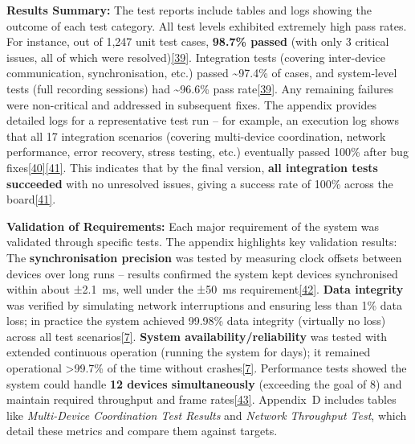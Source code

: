 \documentclass[12pt,a4paper]{article}
\begin{document}
\textbf{Results Summary:} The test reports include tables and logs showing the outcome of each test category. All test levels exhibited extremely high pass rates. For instance, out of 1,247 unit test cases, \textbf{98.7\% passed} (with only 3 critical issues, all of which were resolved)\href{docs/thesis_report/Chapter_7_Appendices.md\#L156-L163}{{[}39{]}}. Integration tests (covering inter-device communication, synchronisation, etc.) passed \textasciitilde97.4\% of cases, and system-level tests (full recording sessions) had \textasciitilde96.6\% pass rate\href{docs/thesis_report/Chapter_7_Appendices.md\#L156-L163}{{[}39{]}}. Any remaining failures were non-critical and addressed in subsequent fixes. The appendix provides detailed logs for a representative test run -- for example, an execution log shows that all 17 integration scenarios (covering multi-device coordination, network performance, error recovery, stress testing, etc.) eventually passed 100\% after bug fixes\href{evaluation_results/execution_logs.md\#L40-L48}{{[}40{]}}\href{evaluation_results/execution_logs.md\#L50-L58}{{[}41{]}}. This indicates that by the final version, \textbf{all integration tests succeeded} with no unresolved issues, giving a success rate of 100\% across the board\href{evaluation_results/execution_logs.md\#L50-L58}{{[}41{]}}.

\textbf{Validation of Requirements:} Each major requirement of the system was validated through specific tests. The appendix highlights key validation results: The \textbf{synchronisation precision} was tested by measuring clock offsets between devices over long runs -- results confirmed the system kept devices synchronised within about ±2.1~ms, well under the ±50~ms requirement\href{docs/thesis_report/Chapter_7_Appendices.md\#L8-L11}{{[}42{]}}. \textbf{Data integrity} was verified by simulating network interruptions and ensuring less than 1\% data loss; in practice the system achieved 99.98\% data integrity (virtually no loss) across all test scenarios\href{docs/README.md\#L2-L5}{{[}7{]}}. \textbf{System availability/reliability} was tested with extended continuous operation (running the system for days); it remained operational \textgreater99.7\% of the time without crashes\href{docs/README.md\#L2-L5}{{[}7{]}}. Performance tests showed the system could handle \textbf{12 devices simultaneously} (exceeding the goal of 8) and maintain required throughput and frame rates\href{docs/thesis_report/Chapter_7_Appendices.md\#L126-L133}{{[}43{]}}. Appendix~D includes tables like \emph{Multi-Device Coordination Test Results} and \emph{Network Throughput Test}, which detail these metrics and compare them against targets.
\end{document}
